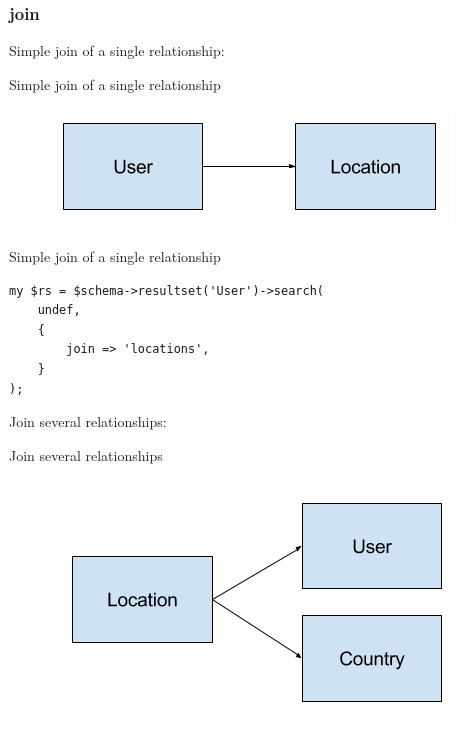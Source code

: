\subsubsection{join}

Simple join of a single relationship:

\begin{frame}[fragile]{Simple join of a single relationship}

\begin{figure}[!ht]
\centering
\includegraphics[width=1\linewidth]{img/join-simple.png}
\end{figure}

\end{frame}

\begin{frame}[fragile]{Simple join of a single relationship}

\begin{lstlisting}
my $rs = $schema->resultset('User')->search(
    undef,
    {
        join => 'locations',
    }
);
\end{lstlisting}
\end{frame}

Join several relationships:

\begin{frame}[fragile]{Join several relationships}
\begin{figure}[!ht]
\centering
\includegraphics[width=1\linewidth]{img/join-several.png}
\end{figure}
\end{frame}

